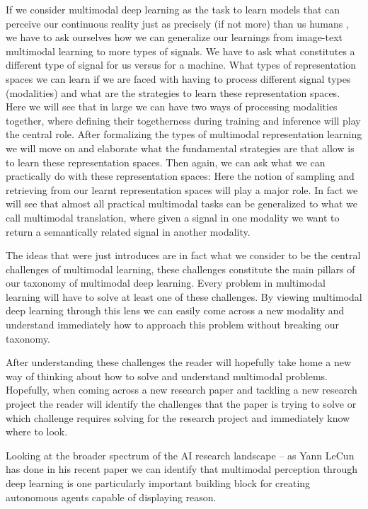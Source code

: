 \documentclass[
]{krantz}
\begin{document}
If we consider multimodal deep learning as the task to learn models that can perceive our continuous reality just as precisely (if not more) than us humans \citep{lecun2022path}, we have to ask ourselves how we can generalize our learnings from image-text multimodal learning to more types of signals. We have to ask what constitutes a different type of signal for us versus for a machine. What types of representation spaces we can learn if we are faced with having to process different signal types (modalities) and what are the strategies to learn these representation spaces. Here we will see that in large we can have two ways of processing modalities together, where defining their togetherness during training and inference will play the central role. After formalizing the types of multimodal representation learning we will move on and elaborate what the fundamental strategies are that allow is to learn these representation spaces. Then again, we can ask what we can practically do with these representation spaces: Here the notion of sampling and retrieving from our learnt representation spaces will play a major role. In fact we will see that almost all practical multimodal tasks can be generalized to what we call multimodal translation, where given a signal in one modality we want to return a semantically related signal in another modality.

The ideas that were just introduces are in fact what we consider to be the central challenges of multimodal learning, these challenges constitute the main pillars of our taxonomy of multimodal deep learning. Every problem in multimodal learning will have to solve at least one of these challenges. By viewing multimodal deep learning through this lens we can easily come across a new modality and understand immediately how to approach this problem without breaking our taxonomy.

After understanding these challenges the reader will hopefully take home a new way of thinking about how to solve and understand multimodal problems. Hopefully, when coming across a new research paper and tackling a new research project the reader will identify the challenges that the paper is trying to solve or which challenge requires solving for the research project and immediately know where to look.

Looking at the broader spectrum of the AI research landscape -- as Yann LeCun has done in his recent paper \citep{lecun2022path} we can identify that multimodal perception through deep learning is one particularly important building block for creating autonomous agents capable of displaying reason.
\end{document}
